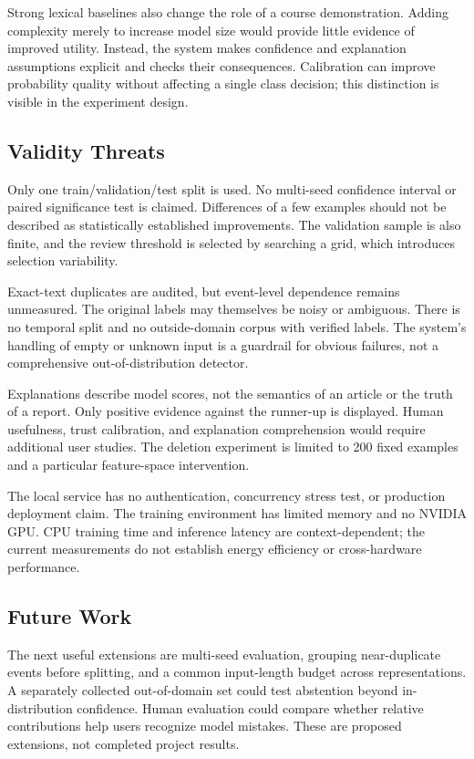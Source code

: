 \documentclass[11pt]{article}
\begin{document}
Strong lexical baselines also change the role of a course demonstration. Adding complexity merely to increase model size would provide little evidence of improved utility. Instead, the system makes confidence and explanation assumptions explicit and checks their consequences. Calibration can improve probability quality without affecting a single class decision; this distinction is visible in the experiment design.

\subsection{Validity Threats}
Only one train/validation/test split is used. No multi-seed confidence interval or paired significance test is claimed. Differences of a few examples should not be described as statistically established improvements. The validation sample is also finite, and the review threshold is selected by searching a grid, which introduces selection variability.

Exact-text duplicates are audited, but event-level dependence remains unmeasured. The original labels may themselves be noisy or ambiguous. There is no temporal split and no outside-domain corpus with verified labels. The system's handling of empty or unknown input is a guardrail for obvious failures, not a comprehensive out-of-distribution detector.

Explanations describe model scores, not the semantics of an article or the truth of a report. Only positive evidence against the runner-up is displayed. Human usefulness, trust calibration, and explanation comprehension would require additional user studies. The deletion experiment is limited to 200 fixed examples and a particular feature-space intervention.

The local service has no authentication, concurrency stress test, or production deployment claim. The training environment has limited memory and no NVIDIA GPU. CPU training time and inference latency are context-dependent; the current measurements do not establish energy efficiency or cross-hardware performance.

\subsection{Future Work}
The next useful extensions are multi-seed evaluation, grouping near-duplicate events before splitting, and a common input-length budget across representations. A separately collected out-of-domain set could test abstention beyond in-distribution confidence. Human evaluation could compare whether relative contributions help users recognize model mistakes. These are proposed extensions, not completed project results.
\end{document}
